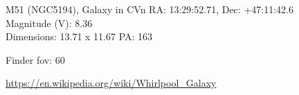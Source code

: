 \begin{block}{M51 (NGC5194), Galaxy in CVn}
    RA: 13:29:52.71, Dec: +47:11:42.6 \\ 
    Magnitude (V): 8.36 \\ 
    Dimensions: 13.71 x 11.67 PA: 163 

    Finder fov: 60 

    \url{https://en.wikipedia.org/wiki/Whirlpool_Galaxy} 
\end{block}